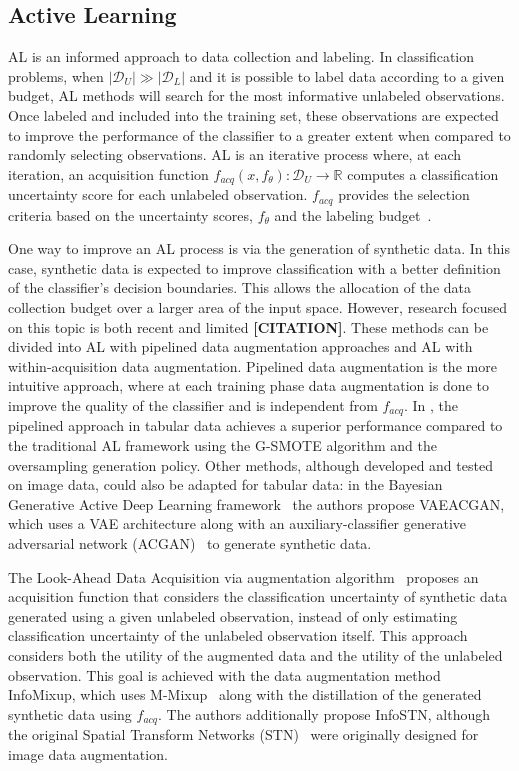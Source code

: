 \documentclass[parskip=full]{scrartcl}
\begin{document}
\subsection{Active Learning}\label{sec:active-learning}

AL is an informed approach to data collection and labeling. In classification
problems, when $|\mathcal{D}_U| \gg |\mathcal{D}_L|$ and it is possible to
label data according to a given budget, AL methods will search for the most
informative unlabeled observations. Once labeled and included into the
training set, these observations are expected to improve the performance of
the classifier to a greater extent when compared to randomly selecting
observations. AL is an iterative process where, at each iteration, an
acquisition function $f_{acq}(x, f_\theta): \mathcal{D}_U \to \mathbb{R}$
computes a classification uncertainty score for each unlabeled observation.
$f_{acq}$ provides the selection criteria based on the uncertainty scores,
$f_\theta$ and the labeling budget~\cite{kim2021lada}.

One way to improve an AL process is via the generation of synthetic data. In
this case, synthetic data is expected to improve classification with a better
definition of the classifier's decision boundaries. This allows the allocation
of the data collection budget over a larger area of the input space. However,
research focused on this topic is both recent and limited \textbf{[CITATION]}.
These methods can be divided into AL with pipelined data augmentation
approaches and AL with within-acquisition data augmentation. Pipelined data
augmentation is the more intuitive approach, where at each training phase data
augmentation is done to improve the quality of the classifier and is
independent from $f_{acq}$. In \citet{fonseca2021increasing}, the pipelined
approach in tabular data achieves a superior performance compared to the
traditional AL framework using the G-SMOTE algorithm and the oversampling
generation policy. Other methods, although developed and tested on image data,
could also be adapted for tabular data: in the Bayesian Generative Active Deep
Learning framework~\cite{tran2019bayesian} the authors propose VAEACGAN, which
uses a VAE architecture along with an auxiliary-classifier generative
adversarial network (ACGAN)~\cite{odena2017conditional} to generate synthetic
data.

The Look-Ahead Data Acquisition via augmentation algorithm~\cite{kim2021lada}
proposes an acquisition function that considers the classification uncertainty
of synthetic data generated using a given unlabeled observation, instead of
only estimating classification uncertainty of the unlabeled observation
itself. This approach considers both the utility of the augmented data and the
utility of the unlabeled observation. This goal is achieved with the data
augmentation method InfoMixup, which uses M-Mixup~\cite{verma2019manifold}
along with the distillation of the generated synthetic data using $f_{acq}$.
The authors additionally propose InfoSTN, although the original Spatial
Transform Networks (STN)~\cite{jaderberg2015spatial} were originally designed
for image data augmentation.
\end{document}
